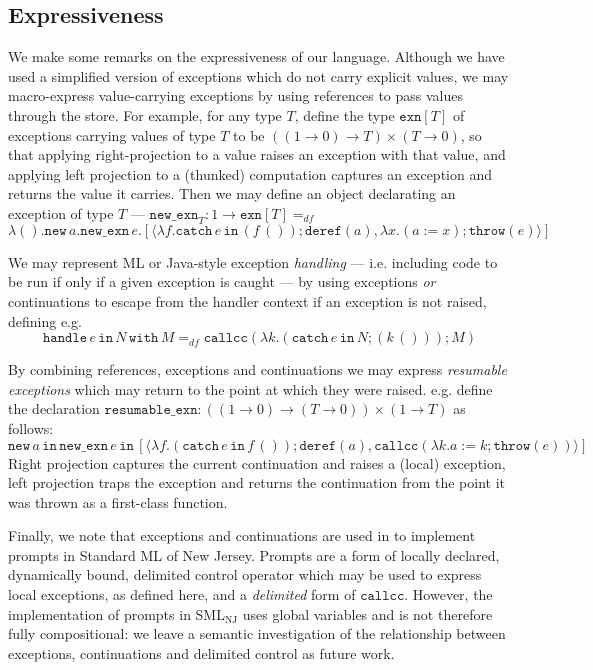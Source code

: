 \documentclass{eptcs}
\def\0{0}
\newcommand{\emp}{{{0}}}
\newcommand{\throw}{{\mathtt{throw}}}
\newcommand{\deref}{{\mathtt{deref}}}
\newcommand{\with}{{\mathtt{with}}}
\newcommand{\spc}{\hspace{2pt}}
\newcommand{\callcc}{{\mathtt{callcc}}}
\newcommand{\nxn}{{\mathtt{new\_exn}}}
\newcommand{\new}{{\mathtt{new}}}
\newcommand{\catch}{{\mathtt{catch}}}
\newcommand{\com}{{{1}}}
\newcommand{\exn}{{\mathtt{exn}}}
\newcommand{\inn}{{{\mathtt{in}}}}
\begin{document}
\subsection{Expressiveness}
We make some remarks on the expressiveness of our language. Although we have used a simplified version of exceptions   which  do not carry explicit  values, we may macro-express value-carrying  exceptions by using references to pass values through the store. For example, for any type $T$, define the type $\exn[T]$ of exceptions carrying values of type $T$ to be  $((\com \rightarrow \0) \rightarrow T) \times (T \rightarrow \0)$, so that applying  right-projection to a value raises an exception with that value, and applying left projection to a (thunked) computation captures an exception and returns the value it carries.  Then we may define an object declarating an exception of type $T$ --- $\nxn_T:\com \rightarrow \exn[T] =_{df}$
$$\lambda ().\new\spc a.\nxn\spc e. [\langle \lambda f.\catch\spc e \spc \inn \spc (f\spc ());\deref(a),\lambda x.(a:=x);\throw(e) \rangle]$$     



We may represent ML or Java-style exception \emph{handling} --- i.e. including code to be run if only if a given exception is caught --- by using exceptions \emph{or} continuations to escape from the handler context if an exception is not raised, defining e.g.
 $${\mathtt{handle}} \spc e\spc\inn\spc N\spc \with\spc M   =_{df} \callcc(\lambda k. (\catch\spc e \spc \inn\spc  N;(k\spc ()));M)$$


By combining references, exceptions and continuations we may express \emph{resumable exceptions} which may return to the point at which they were raised. 
e.g. define the declaration ${\mathtt{resumable\_exn}}: ((1\rightarrow 0) \rightarrow (T \rightarrow  \emp)) \times (\com \rightarrow T)$ as follows: 
$$\new \spc a\spc \inn\spc \nxn\spc e\spc \inn \spc [\langle \lambda f. (\catch\spc e \spc \inn\spc  f\spc ());\deref(a), \callcc(\lambda k.a:=k;\throw(e))\rangle] $$
Right projection captures the current continuation and raises a (local) exception, left projection traps the exception and returns the continuation from the point it was thrown as a first-class function. 






Finally, we note that exceptions and continuations are used in \cite{GRR} to implement prompts in Standard ML of New Jersey. Prompts are a form of locally declared, dynamically bound, delimited control operator which may be used to express   local exceptions, as defined here, and a \emph{delimited} form of $\callcc$. However, the implementation of prompts in SML$_{\mathrm{NJ}}$ uses global variables and is not therefore fully compositional: we leave a semantic investigation of the relationship between exceptions, continuations and delimited control as future work.  
\end{document}
